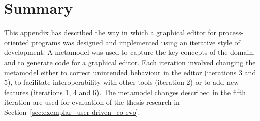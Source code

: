 \section{Summary}
This appendix has described the way in which a graphical editor for process-oriented programs was designed and implemented using an iterative style of development. A metamodel was used to capture the key concepts of the domain, and to generate code for a graphical editor. Each iteration involved changing the metamodel either to correct unintended behaviour in the editor (iterations 3 and 5), to facilitate interoperability with other tools (iteration 2) or to add new features (iterations 1, 4 and 6). The metamodel changes described in the fifth iteration are used for evaluation of the thesis research in Section~\ref{sec:exemplar_user-driven_co-evo}.

